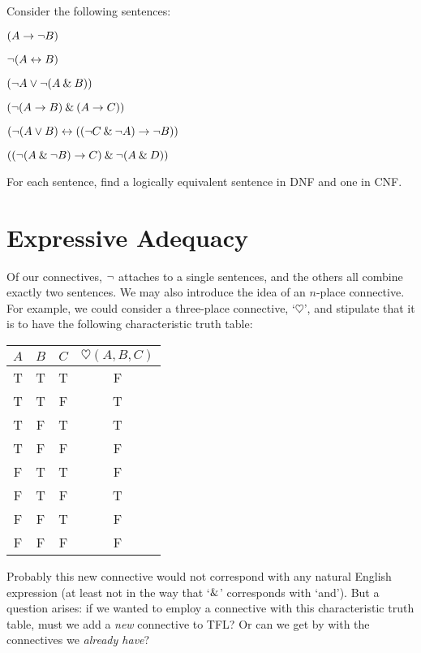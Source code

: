 \begin{practiceproblems}
\problempart
\label{pr.DNF}
Consider the following sentences:
	\begin{earg}
		\item $(A \rightarrow \neg B)$
		\item $\neg (A \leftrightarrow B)$
		\item $(\neg A \vee \neg (A \mathbin{\&} B))$
		\item $(\neg (A \rightarrow B ) \mathbin{\&} (A \rightarrow C))$
		\item $(\neg (A \vee B) \leftrightarrow ((\neg C \mathbin{\&} \neg A) \rightarrow \neg B))$
		\item $((\neg (A \mathbin{\&} \neg B) \rightarrow C) \mathbin{\&} \neg (A \mathbin{\&} D))$
	\end{earg}
        For each sentence, find a logically equivalent sentence in DNF and one in CNF.

\end{practiceproblems}


\chapter{Expressive Adequacy}\label{ch:ExpressiveAdequacy}

Of our connectives, $\neg$ attaches to a single sentences, and the others all combine exactly two sentences. We may also introduce the idea of an $n$-place connective. For example, we could consider a three-place connective, `$\heartsuit$', and stipulate that it is to have the following characteristic truth table:
\begin{center}
\begin{tabular}{c c c | c}
$A$ & $B$ & $C$ & $\heartsuit(A,B,C)$\\
\hline
 T & T & T & F \\
 T & T & F & T \\
 T & F & T & T \\
 T & F & F & F \\
 F & T & T & F \\
 F & T & F & T \\
 F & F & T & F \\
 F & F & F & F
\end{tabular}
\end{center}
Probably this new connective would not correspond with any natural English expression (at least not in the way that `$\mathbin{\&}$' corresponds with `and'). But a question arises: if we wanted to employ a connective with this characteristic truth table, must we add a \emph{new} connective to TFL? Or can we get by with the connectives we \emph{already have}?

